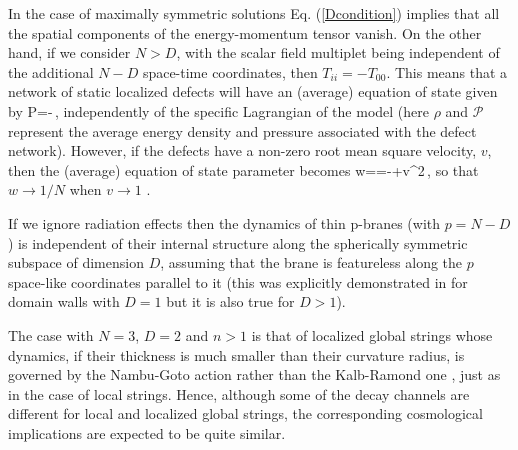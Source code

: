 \documentclass[prd,twocolumn,a4paper,superscriptaddress,floatfix]{revtex4}
\begin{document}
In the case of maximally symmetric solutions Eq. (\ref{Dcondition}) implies that all the spatial components of the energy-momentum tensor vanish. On the other hand, if we consider $N>D$, with the scalar field multiplet being independent of the additional $N-D$ space-time coordinates, then $T_{ii}=-T_{00}$. This means that a network of static localized defects will have an (average) equation of state given by
\be\label{funcionalEqSt}
{\mathcal P}=-\rho\,,
\ee
independently of the specific Lagrangian of the model (here $\rho$ and $\mathcal P$ represent the average energy density and pressure associated with the defect network). However, if the defects have a non-zero root mean square
velocity, $v$, then the (average) equation of state parameter becomes
\be\label{funcionalEqSt1}
w==-+v^2\,,
\ee
so that $w \to 1/N$ when $v \to 1$ \cite{Avelino:2008mv}. 

If we ignore radiation effects then the dynamics of thin p-branes (with $p=N-D$) is independent of their internal structure along the spherically symmetric subspace of dimension $D$, assuming that the brane is featureless along the $p$ space-like coordinates parallel to it (this was explicitly demonstrated in \cite{Avelino:2008ve,2010PhRvD..81h7305S} for domain walls with $D=1$ but it is also true for $D>1$). 

The case with $N=3$, $D=2$ and $n>1$ is that of localized global strings whose dynamics, if their thickness is much smaller than their curvature radius, is governed by the Nambu-Goto action \cite{1971PThPh..46.1560G} rather than the Kalb-Ramond one \cite{1974PhRvD...9.2273K}, just as in the case of local strings. Hence, although some of the decay channels are different for local and localized global strings, the corresponding cosmological implications are expected to be quite similar. 
\end{document}
